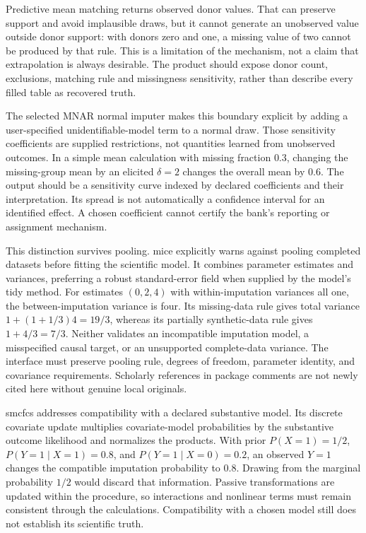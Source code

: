 Predictive mean matching returns observed donor values. That can preserve support and avoid implausible draws, but it cannot generate an unobserved value outside donor support: with donors zero and one, a missing value of two cannot be produced by that rule. This is a limitation of the mechanism, not a claim that extrapolation is always desirable. The product should expose donor count, exclusions, matching rule and missingness sensitivity, rather than describe every filled table as recovered truth.~\citep{exec25_rtm_mice,exec25_rtm_choice}

The selected MNAR normal imputer makes this boundary explicit by adding a user-specified unidentifiable-model term to a normal draw. Those sensitivity coefficients are supplied restrictions, not quantities learned from unobserved outcomes. In a simple mean calculation with missing fraction $0.3$, changing the missing-group mean by an elicited $\delta=2$ changes the overall mean by $0.6$. The output should be a sensitivity curve indexed by declared coefficients and their interpretation. Its spread is not automatically a confidence interval for an identified effect. A chosen coefficient cannot certify the bank's reporting or assignment mechanism.~\citep{exec25_rtm_mice,exec25_rtm_choice}

This distinction survives pooling. mice explicitly warns against pooling completed datasets before fitting the scientific model. It combines parameter estimates and variances, preferring a robust standard-error field when supplied by the model's tidy method. For estimates $(0,2,4)$ with within-imputation variances all one, the between-imputation variance is four. Its missing-data rule gives total variance $1+(1+1/3)4=19/3$, whereas its partially synthetic-data rule gives $1+4/3=7/3$. Neither validates an incompatible imputation model, a misspecified causal target, or an unsupported complete-data variance. The interface must preserve pooling rule, degrees of freedom, parameter identity, and covariance requirements. Scholarly references in package comments are not newly cited here without genuine local originals.~\citep{exec25_rtm_mice,exec25_rtm_choice}

smcfcs addresses compatibility with a declared substantive model. Its discrete covariate update multiplies covariate-model probabilities by the substantive outcome likelihood and normalizes the products. With prior $P(X=1)=1/2$, $P(Y=1\mid X=1)=0.8$, and $P(Y=1\mid X=0)=0.2$, an observed $Y=1$ changes the compatible imputation probability to $0.8$. Drawing from the marginal probability $1/2$ would discard that information. Passive transformations are updated within the procedure, so interactions and nonlinear terms must remain consistent through the calculations. Compatibility with a chosen model still does not establish its scientific truth.~\citep{exec25_rtm_smcfcs,exec25_rtm_choice}

